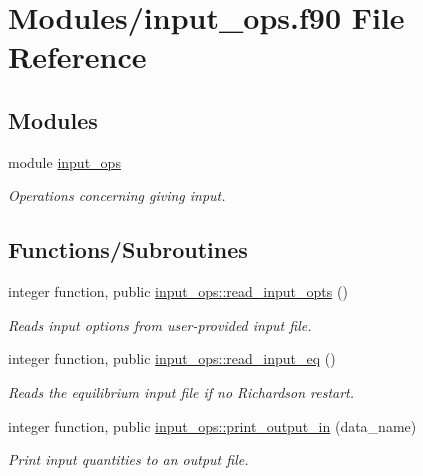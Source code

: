 \hypertarget{input__ops_8f90}{}\section{Modules/input\+\_\+ops.f90 File Reference}
\label{input__ops_8f90}
\subsection*{Modules}
\begin{DoxyCompactItemize}
\item 
module \hyperlink{namespaceinput__ops}{input\+\_\+ops}
\begin{DoxyCompactList}\small\item\em Operations concerning giving input. \end{DoxyCompactList}\end{DoxyCompactItemize}
\subsection*{Functions/\+Subroutines}
\begin{DoxyCompactItemize}
\item 
integer function, public \hyperlink{namespaceinput__ops_a434acca4f59f9dc1d91e04f846133684}{input\+\_\+ops\+::read\+\_\+input\+\_\+opts} ()
\begin{DoxyCompactList}\small\item\em Reads input options from user-\/provided input file. \end{DoxyCompactList}\item 
integer function, public \hyperlink{namespaceinput__ops_a577c897cc266961eb40bb5ef747fa077}{input\+\_\+ops\+::read\+\_\+input\+\_\+eq} ()
\begin{DoxyCompactList}\small\item\em Reads the equilibrium input file if no Richardson restart. \end{DoxyCompactList}\item 
integer function, public \hyperlink{namespaceinput__ops_a84ec7b3833da80ebb36ae0d5ff1a9e0a}{input\+\_\+ops\+::print\+\_\+output\+\_\+in} (data\+\_\+name)
\begin{DoxyCompactList}\small\item\em Print input quantities to an output file. \end{DoxyCompactList}\end{DoxyCompactItemize}
